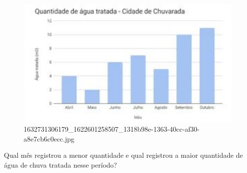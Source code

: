 \begin{escolha}
\begin{boxmedio}
\begin{boxmedio}
{\begin{boxpeq}
\begin{boxpeq}
{\begin{boxpeq}
\begin{boxmedio}
\begin{boxmedio}
\begin{boxpeq}
\begin{boxmedio}
\begin{boxpeq}
\begin{boxpeq}
\begin{boxpeq}
\begin{boxpeq}
\begin{boxmedio}
{\begin{boxmedio}
\begin{boxmedio}
\begin{boxpeq}
\begin{boxmedio}
\begin{boxpeq}
\begin{boxpeq}
\begin{boxpeq}
\begin{escolha}
{\begin{boxmedio}
\begin{boxpeq}
\begin{boxpeq}
\begin{boxpeq}
\begin{boxpeq}
\begin{boxpeq}
\begin{boxmedio}
\begin{boxpeq}
\begin{boxpeq}
\begin{boxpeq}
{\begin{boxpeq}
\begin{boxmedio}
\begin{boxpeq}
\begin{boxpeq}
\begin{boxpeq}
{\begin{boxpeq}
\begin{boxmedio}
{\begin{boxpeq}
\begin{boxpeq}
\begin{boxmedio}
\begin{boxmedio}
\begin{boxpeq}
\begin{boxpeq}
{\begin{boxpeq}
\begin{boxpeq}
\begin{boxpeq}
\begin{boxpeq}
\begin{boxpeq}
\begin{escolha}
\begin{escolha}
{\begin{boxmedio}
\begin{boxpeq}
\begin{q°}
\begin{boxmedio}
\begin{boxpeq}
\begin{boxpeq}
\begin{boxmedio}
\begin{boxmedio}
\begin{boxmedio}
\begin{boxmedio}
\begin{figure}
\centering
\includegraphics[width=4.95586in,height=2.50694in]{./_SAEB_9_MAT/media/image216.jpg}
\caption{1632731306179\_1622601258507\_1318b98e-1363-40cc-af30-a8e7cb6c0ecc.jpg}
\end{figure}


\begin{escolha}

  \item Qual mês registrou a menor quantidade e qual registrou a maior
  quantidade de água de chuva tratada nesse período?




\end{escolha}
\end{boxmedio}
\end{boxmedio}
\end{boxmedio}
\end{boxmedio}
\end{boxpeq}
\end{boxpeq}
\end{boxmedio}
\end{q°}
\end{boxpeq}
\end{boxmedio}}
\end{escolha}
\end{escolha}
\end{boxpeq}
\end{boxpeq}
\end{boxpeq}
\end{boxpeq}
\end{boxpeq}}
\end{boxpeq}
\end{boxpeq}
\end{boxmedio}
\end{boxmedio}
\end{boxpeq}
\end{boxpeq}}
\end{boxmedio}
\end{boxpeq}}
\end{boxpeq}
\end{boxpeq}
\end{boxpeq}
\end{boxmedio}
\end{boxpeq}}
\end{boxpeq}
\end{boxpeq}
\end{boxpeq}
\end{boxmedio}
\end{boxpeq}
\end{boxpeq}
\end{boxpeq}
\end{boxpeq}
\end{boxpeq}
\end{boxmedio}}
\end{escolha}
\end{boxpeq}
\end{boxpeq}
\end{boxpeq}
\end{boxmedio}
\end{boxpeq}
\end{boxmedio}
\end{boxmedio}}
\end{boxmedio}
\end{boxpeq}
\end{boxpeq}
\end{boxpeq}
\end{boxpeq}
\end{boxmedio}
\end{boxpeq}
\end{boxmedio}
\end{boxmedio}
\end{boxpeq}}
\end{boxpeq}
\end{boxpeq}}
\end{boxmedio}
\end{boxmedio}
\end{escolha}
